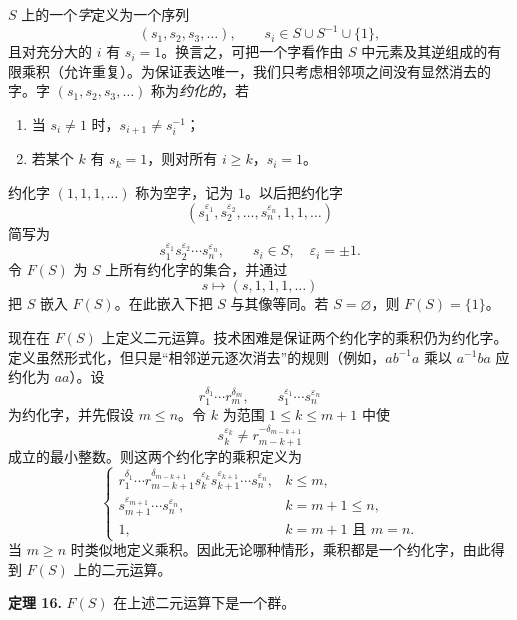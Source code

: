$S$ 上的一个\emph{字}定义为一个序列
\[
  (s_1,s_2,s_3,\ldots),
  \qquad s_i\in S\cup S^{-1}\cup\{1\},
\]
且对充分大的 $i$ 有 $s_i=1$。换言之，可把一个字看作由 $S$ 中元素及其逆组成的有限乘积（允许重复）。为保证表达唯一，我们只考虑相邻项之间没有显然消去的字。字 $(s_1,s_2,s_3,\ldots)$ 称为\emph{约化的}，若
\begin{enumerate}[label=(\arabic*)]
  \item 当 $s_i\neq1$ 时，$s_{i+1}\neq s_i^{-1}$；
  \item 若某个 $k$ 有 $s_k=1$，则对所有 $i\geq k$，$s_i=1$。
\end{enumerate}
约化字 $(1,1,1,\ldots)$ 称为空字，记为 $1$。以后把约化字
\[
  (s_1^{\varepsilon_1},s_2^{\varepsilon_2},\ldots,s_n^{\varepsilon_n},1,1,\ldots)
\]
简写为
\[
  s_1^{\varepsilon_1}s_2^{\varepsilon_2}\cdots s_n^{\varepsilon_n},
  \qquad s_i\in S,
  \quad \varepsilon_i=\pm1.
\]
令 $F(S)$ 为 $S$ 上所有约化字的集合，并通过
\[
  s\longmapsto (s,1,1,1,\ldots)
\]
把 $S$ 嵌入 $F(S)$。在此嵌入下把 $S$ 与其像等同。若 $S=\varnothing$，则 $F(S)=\{1\}$。

现在在 $F(S)$ 上定义二元运算。技术困难是保证两个约化字的乘积仍为约化字。定义虽然形式化，但只是“相邻逆元逐次消去”的规则（例如，$ab^{-1}a$ 乘以 $a^{-1}ba$ 应约化为 $aa$）。设
\[
  r_1^{\delta_1}\cdots r_m^{\delta_m},
  \qquad
  s_1^{\varepsilon_1}\cdots s_n^{\varepsilon_n}
\]
为约化字，并先假设 $m\leq n$。令 $k$ 为范围 $1\leq k\leq m+1$ 中使
\[
  s_k^{\varepsilon_k}\neq r_{m-k+1}^{-\delta_{m-k+1}}
\]
成立的最小整数。则这两个约化字的乘积定义为
\[
\begin{cases}
 r_1^{\delta_1}\cdots r_{m-k+1}^{\delta_{m-k+1}}
 s_k^{\varepsilon_k}s_{k+1}^{\varepsilon_{k+1}}\cdots s_n^{\varepsilon_n}, & k\leq m,\\[2mm]
 s_{m+1}^{\varepsilon_{m+1}}\cdots s_n^{\varepsilon_n}, & k=m+1\leq n,\\[2mm]
 1, & k=m+1\text{ 且 }m=n.
\end{cases}
\]
当 $m\geq n$ 时类似地定义乘积。因此无论哪种情形，乘积都是一个约化字，由此得到 $F(S)$ 上的二元运算。

\medskip
\noindent\textbf{定理 16.} $F(S)$ 在上述二元运算下是一个群。

